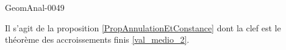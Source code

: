 \begin{corrige}{GeomAnal-0049}

    Il s'agit de la proposition \ref{PropAnnulationEtConstance} dont la clef est le théorème des accroissements finis \ref{val_medio_2}.

\end{corrige}
